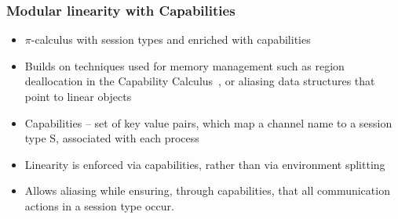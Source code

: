\begin{frame}\frametitle{Modular linearity with Capabilities}
  \begin{itemize}
    \item $\pi$-calculus with session types and enriched with capabilities
    \item Builds on techniques used for memory management such as region deallocation in the Capability Calculus~\cite{Crary:1999:TMM:292540.292564}, or aliasing data structures that point to linear objects~\cite{FahndrichM:adofpl1}
    \item  Capabilities -- set of key value pairs, which map a channel name to a session type S, associated with each process
    \item Linearity is enforced via capabilities, rather than via environment splitting
    \item Allows aliasing while ensuring, through capabilities, that all communication actions in a session type occur.

  \end{itemize}
\end{frame}

